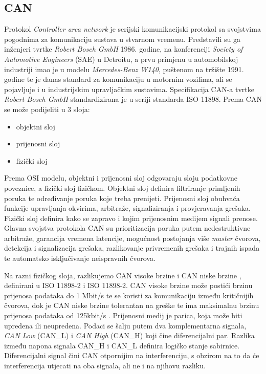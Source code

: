\documentclass[times, utf8, diplomski, numeric]{fer}
\begin{document}
\subsection{CAN}
Protokol \textit{Controller area network} je serijski komunikacijski protokol sa svojstvima pogodnima za komunikaciju sustava u stvarnom vremenu\cite{bosch1991}. Predstavili su ga inženjeri tvrtke \textit{Robert Bosch GmbH} 1986. godine, na konferenciji \textit{Society of Automotive Engineers} (SAE) u Detroitu, a prvu primjenu u automobilskoj industriji imao je u modelu \textit{Mercedes-Benz W140}, puštenom na tržište 1991. godine te je danas standard za komunikaciju u motornim vozilima, ali se pojavljuje i u industrijskim upravljačkim sustavima\cite{bosch2022handbook, mercedes1991can}. Specifikacija CAN-a tvrtke \textit{Robert Bosch GmbH} standardizirana je u seriji standarda ISO 11898. 
\newpage
Prema \cite{bosch1991} CAN se može podijeliti u 3 sloja:
\begin{itemize}
    \item objektni sloj 
    \item prijenosni sloj
    \item fizički sloj 
\end{itemize}
Prema OSI modelu, objektni i prijenosni sloj odgovaraju sloju podatkovne poveznice, a fizički sloj fizičkom. Objektni sloj definira filtriranje primljenih poruka te određivanje poruka koje treba prenijeti. Prijenosni sloj obuhvaća funkcije upravljanja okvirima, arbitraže, signaliziranja i provjeravanja grešaka. Fizički sloj definira kako se zapravo i kojim prijenosnim medijem signali prenose. Glavna svojstva protokola CAN su prioritizacija poruka putem nedestruktivne arbitraže, garancija vremena latencije, mogućnost postojanja više \textit{master} čvorova, detekcija i signalizacija grešaka, razlikovanje privremenih grešaka i trajnih ispada te automatsko isključivanje neispravnih čvorova. 

Na razni fizičkog sloja, razlikujemo CAN visoke brzine  i CAN niske brzine , definirani u ISO 11898-2 i ISO 11898-2. CAN visoke brzine može postići brzinu prijenosa podataka do 1 Mbit/s te se koristi za komunikaciju između kritičnijih čvorova, dok je CAN niske brzine tolerantan na greške te ima maksimalnu brzinu prijenosa podataka od 125kbit/s \cite{bosch2022handbook}. Prijenosni medij je parica, koja može biti upredena ili neupredena. Podaci se šalju putem dva komplementarna signala, \textit{CAN Low} (CAN\_L) i \textit{CAN High} (CAN\_H) koji čine diferencijalni par. Razlika između napona signala CAN\_H i CAN\_L definira logičko stanje sabirnice. Diferencijalni signal čini CAN otpornijim na interferenciju, s obzirom na to da će interferencija utjecati na oba signala, ali ne i na njihovu razliku\cite{bosch2022handbook}. 
\end{document}
